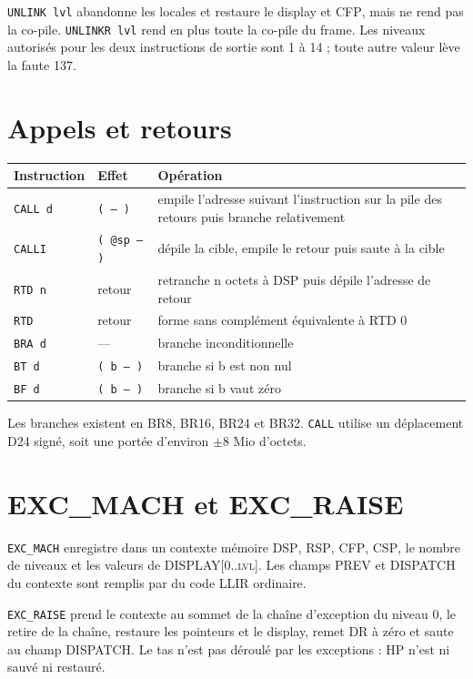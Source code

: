 \documentclass[10pt,a4paper,twoside,openany]{book}
\newcommand{\stack}[1]{\texttt{#1}}
\newcommand{\reg}[1]{\textsc{#1}}
\begin{document}
\texttt{UNLINK lvl} abandonne les locales et restaure le display et \reg{CFP}, mais ne rend pas la co-pile. \texttt{UNLINKR lvl} rend en plus toute la co-pile du frame. Les niveaux autorisés pour les deux instructions de sortie sont 1 à 14 ; toute autre valeur lève la faute 137.

\section{Appels et retours}
\begin{center}
\begin{tabularx}{\linewidth}{@{}l l X@{}}
\toprule
Instruction & Effet & Opération\\ \midrule
\texttt{CALL d} & \stack{( -- )} & empile l'adresse suivant l'instruction sur la pile des retours puis branche relativement\\
\texttt{CALLI} & \stack{( @sp -- )} & dépile la cible, empile le retour puis saute à la cible\\
\texttt{RTD n} & retour & retranche n octets à DSP puis dépile l'adresse de retour\\
\texttt{RTD} & retour & forme sans complément équivalente à RTD 0\\
\texttt{BRA d} & --- & branche inconditionnelle\\
\texttt{BT d} & \stack{( b -- )} & branche si b est non nul\\
\texttt{BF d} & \stack{( b -- )} & branche si b vaut zéro\\
\bottomrule
\end{tabularx}
\end{center}

Les branches existent en BR8, BR16, BR24 et BR32. \texttt{CALL} utilise un déplacement D24 signé, soit une portée d'environ $\pm 8$ Mio d'octets.

\section{EXC\_MACH et EXC\_RAISE}
\texttt{EXC\_MACH} enregistre dans un contexte mémoire \reg{DSP}, \reg{RSP}, \reg{CFP}, \reg{CSP}, le nombre de niveaux et les valeurs de \reg{DISPLAY[0..lvl]}. Les champs PREV et DISPATCH du contexte sont remplis par du code LLIR ordinaire.

\texttt{EXC\_RAISE} prend le contexte au sommet de la chaîne d'exception du niveau 0, le retire de la chaîne, restaure les pointeurs et le display, remet \reg{DR} à zéro et saute au champ DISPATCH. Le tas n'est pas déroulé par les exceptions : \reg{HP} n'est ni sauvé ni restauré.
\end{document}
